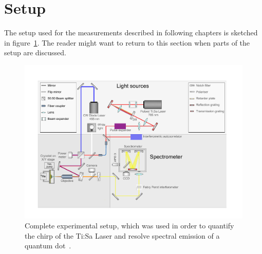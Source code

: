 \section{Setup}

The setup used for the measurements described in following chapters is sketched in figure~\ref{fig:setupflat}.
The reader might want to return to this section when parts of the setup are discussed.

\begin{figure}[H]
	\centering
	\includegraphics[width=1.1\linewidth]{figures/setup/Setup_flat}
	\caption[Complete experimental setup]{Complete experimental setup, which was used in order to quantify the chirp of the Ti:Sa Laser and resolve spectral emission of a quantum dot~\cite{schimpf_towards_2017}.}
	\label{fig:setupflat}
\end{figure}
